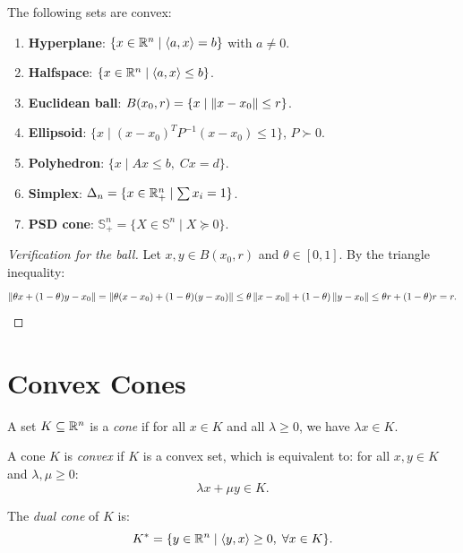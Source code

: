 \begin{example}
The following sets are convex:
\begin{enumerate}
    \item \textbf{Hyperplane}: $\{x \in \mathbb{R}^n \mid \langle a, x \rangle = b\}$ with $a \neq 0$.
    \item \textbf{Halfspace}: $\{x \in \mathbb{R}^n \mid \langle a, x \rangle \leq b\}$.
    \item \textbf{Euclidean ball}: $B(x_0, r) = \{x \mid \left\| x - x_0 \right\| \leq r\}$.
    \item \textbf{Ellipsoid}: $\{x \mid (x-x_0)^T P^{-1}(x-x_0) \leq 1\}$, $P \succ 0$.
    \item \textbf{Polyhedron}: $\{x \mid Ax \leq b, \; Cx = d\}$.
    \item \textbf{Simplex}: $\Delta_n = \{x \in \mathbb{R}^n_+ \mid \sum x_i = 1\}$.
    \item \textbf{PSD cone}: $\mathbb{S}^n_+ = \{X \in \mathbb{S}^n \mid X \succeq 0\}$.
\end{enumerate}
\end{example}

\begin{proof}[Verification for the ball]
Let $x, y \in B(x_0, r)$ and $\theta \in [0,1]$. By the triangle inequality:
\[
    \left\| \theta x + (1-\theta)y - x_0 \right\|
    = \left\| \theta(x-x_0) + (1-\theta)(y-x_0) \right\|
    \leq \theta\left\| x-x_0 \right\| + (1-\theta)\left\| y-x_0 \right\|
    \leq \theta r + (1-\theta)r = r.
\]
\end{proof}

\section{Convex Cones}

\begin{definition}[Cone]
A set $K \subseteq \mathbb{R}^n$ is a \emph{cone} if for all $x \in K$ and all
$\lambda \geq 0$, we have $\lambda x \in K$.
\end{definition}

\begin{definition}
A cone $K$ is \emph{convex} if $K$ is a convex set, which is equivalent to:
for all $x, y \in K$ and $\lambda, \mu \geq 0$:
\[
    \lambda x + \mu y \in K.
\]
\end{definition}

\begin{definition}
The \emph{dual cone} of $K$ is:
\[
    K^* = \{y \in \mathbb{R}^n \mid \langle y, x \rangle \geq 0, \; \forall x \in K\}.
\]
\end{definition}

